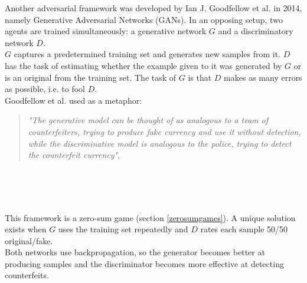 Another adversarial framework was developed by Ian J. Goodfellow et al. \cite{gansgoodfellow2014generative} in 2014, namely Generative Adversarial Networks (GANs). 
In an opposing setup, two agents are trained simultaneously: a generative network $G$ and a discriminatory network $D$. \\
$G$ captures a predetermined training set and generates new samples from it. $D$ has the task of estimating whether the example given to it was generated by $G$ or is an original from the training set. The task of $G$ is that $D$ makes as many errors as possible, i.e. to fool $D$.\\
Goodfellow et al. used as a metaphor:
\begin{quote}
\textit{"The generative model can be thought of as analogous to a team of counterfeiters, trying to produce fake currency and use it without detection, while the discriminative model is analogous to the police, trying to detect the counterfeit currency"}, \cite{gansgoodfellow2014generative}
\end{quote}{}
\\
\\

\\
This framework is a zero-sum game (section \ref{zerosumgames}). A unique solution exists when $G$ uses the training set repeatedly and $D$ rates each sample 50/50 original/fake.\\
Both networks use backpropagation, so the generator becomes better at producing samples and the discriminator becomes more effective at detecting counterfeits.
\\
